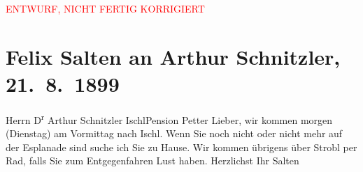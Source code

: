 
\begin{center}
            \textcolor{red}{ENTWURF, NICHT FERTIG KORRIGIERT}
                      \end{center}
            
         \renewcommand{\erwaehnteOrte}{Orte: Bad Ischl, Esplanade, Hotel und Pension Rudolfshöhe (Leopold Petter), Strobl, Unterach am Attersee}
         \renewcommand{\erwaehnteWerke}{}
               \section[Felix Salten an Arthur Schnitzler, 21. 8. 1899]{ Felix Salten an Arthur Schnitzler, 21. 8. 1899}\nopagebreak{}\rehead{ }\begin{ledgroupsized}[t]{13cm}\normalsize\beginnumbering \toendnotes[C]{\smallbreak\pagebreak[2]} 
\pstart{}{\pb}Herrn D\textsuperscript{r} Arthur Schnitzler \pend{}\pstart{}Ischl\pend{}\pstart{}Pension Petter\pend{}{\bigskip}\pstart
           \noindent{}{\pb}Lieber, wir kommen morgen (Dienstag) am
                  Vormittag nach Ischl. Wenn Sie
               noch nicht oder nicht mehr auf der Esplanade sind suche
               ich Sie zu Hause. Wir kommen übrigens über Strobl per
               Rad, falls Sie zum Entgegenfahren Lust haben.\pend
           \pstart Herzlichst Ihr \spacefill\mbox{Salten}\pend{}
         
         \endnumbering{}\end{ledgroupsized}\begin{anhang}\end{anhang}\newcommand{\dateiname}{L03298}\newcommand{\titel}{Felix Salten an Arthur Schnitzler, 21. 8. 1899}\newcommand{\editorInnen}{Martin Anton Müller und Laura Untner}
      